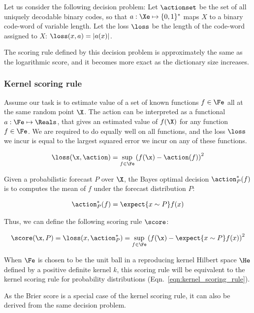 Let us consider the following decision problem: Let $\actionset$ be the set of all uniquely decodable binary codes, so that $a:\Xe\mapsto\{0,1\}^{*}$ maps $X$ to a binary code-word of variable length. Let the loss $\loss$ be the length of the code-word assigned to $X$: $\loss(x,a) = \vert a(x)\vert$.

The scoring rule defined by this decision problem is approximately the same as the logarithmic score, and it becomes more exact as the dictionary size increases.

\subsubsection{Kernel scoring rule}

Assume our task is to estimate value of a set of known functions $f\in{\Fe}$ all at the same random point $\X$. The action can be interpreted as a functional $a:\Fe\mapsto\Reals$, that gives an estimated value of $f(\X)$ for any function $f\in\Fe$. We are required to do equally well on all functions, and the loss $\loss$ we incur is equal to the largest squared error we incur on any of these functions.

\begin{equation}
	\loss(\x, \action) = \sup_{f\in\Fe}\left( f(\x) - \action(f)\right)^2
\end{equation}

Given a probabilistic forecast $P$ over $\X$, the Bayes optimal decision $\action^{*}_{P}(f)$ is to computes the mean of $f$ under the forecast distribution $P$:

\begin{equation}
	\action^{*}_{P}(f) = \expect{x\sim P} f(x)
\end{equation}

Thus, we can define the following scoring rule $\score$:

\begin{equation}
	\score(\x,P) = \loss(x,\action^{*}_{P} )
		= 	\sup_{f\in\Fe}\left( f(\x) - \expect{x\sim P} f(x) \right)^2
\end{equation}

When $\Fe$ is chosen to be the unit ball in a reproducing kernel Hilbert space $\He$ defined by a positive definite kernel $k$, this scoring rule will be equivalent to the kernel scoring rule for probability distributions (Eqn.\ \eqref{eqn:kernel_scoring_rule}).

As the Brier score is a special case of the kernel scoring rule, it can also be derived from the same decision problem.

